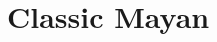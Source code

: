 \documentclass[../main.tex]{subfiles}
\begin{document}
\chapter{Classic Mayan}
\label{chap:classic-mayan}
\end{document}
